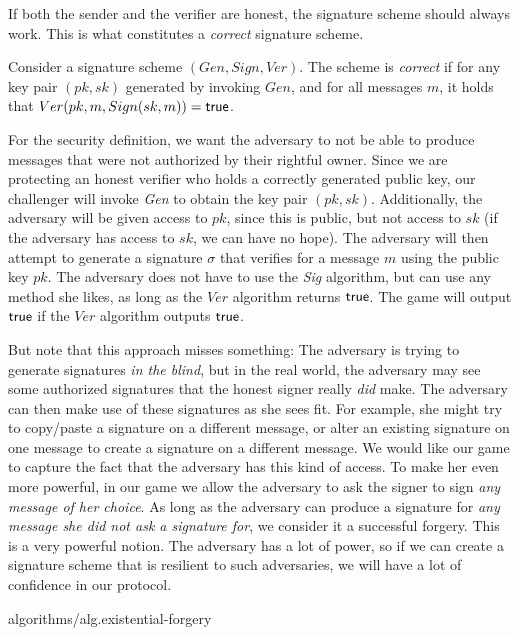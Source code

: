 If both the sender and the verifier are honest, the signature scheme should always
work. This is what constitutes a \emph{correct} signature scheme.

\begin{definition}
  Consider a signature scheme $(Gen, Sign, Ver)$. The scheme is \emph{correct} if
  for any key pair $(pk, sk)$ generated by invoking $Gen$, and
  for all messages $m$, it holds that $Ver(pk, m, Sign(sk, m)) = \textsf{true}$.
\end{definition}

For the security definition, we want the adversary to not be able to produce
messages that were not authorized by their rightful owner. Since we are protecting
an honest verifier who holds a correctly generated public key, our challenger will
invoke \emph{Gen} to obtain the key pair $(pk, sk)$. Additionally, the adversary will
be given access to $pk$, since this is public, but not access to $sk$ (if the adversary
has access to $sk$, we can have no hope). The adversary will then attempt to generate
a signature $\sigma$ that verifies for a message $m$ using the public key $pk$.
The adversary does not have to use the \emph{Sig} algorithm, but can use any method
she likes, as long as the $Ver$ algorithm returns $\textsf{true}$. The game will output
$\textsf{true}$ if the $Ver$ algorithm outputs $\textsf{true}$.

But note that this approach misses something: The adversary is trying to generate
signatures \emph{in the blind}, but in the real world, the adversary may see some
authorized signatures that the honest signer really \emph{did} make. The adversary
can then make use of these signatures as she sees fit. For example, she might try
to copy/paste a signature on a different message, or alter an existing signature
on one message to create a signature on a different message. We would like our
game to capture the fact that the adversary has this kind of access. To make her
even more powerful, in our game we allow the adversary to ask the signer to sign
\emph{any message of her choice}. As long as the adversary can produce a signature
for \emph{any message she did not ask a signature for}, we consider it a successful
forgery. This is a very powerful notion. The adversary has a lot of power, so if
we can create a signature scheme that is resilient to such adversaries, we will have
a lot of confidence in our protocol.

{algorithms/alg.existential-forgery}

